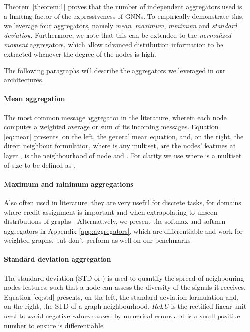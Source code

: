\documentclass{article}
\begin{document}
Theorem \ref{theorem:1} proves that the number of independent aggregators used is a limiting factor of the expressiveness of GNNs. To empirically demonstrate this, we leverage four aggregators, namely \textit{mean}, \textit{maximum}, \textit{minimum} and \textit{standard deviation}. Furthermore, we note that this can be extended to the \textit{normalized moment} aggregators, which allow advanced distribution information to be extracted whenever the degree of the nodes is high. 

The following paragraphs will describe the aggregators we leveraged in our architectures.

\paragraph{Mean aggregation }
The most common message aggregator in the literature, wherein each node computes a weighted average or sum of its incoming messages. Equation \ref{eq:mean} presents, on the left, the general mean equation, and, on the right, the direct neighbour formulation, where  is any multiset,  are the nodes' features at layer ,  is the neighbourhood of node  and . For clarity we use  where  is a multiset of size  to be defined as .



\paragraph{Maximum and minimum aggregations }
Also often used in literature, they are very useful for discrete tasks, for domains where credit assignment is important and when extrapolating to unseen distributions of graphs \cite{velickovic2019neural}. Alternatively, we present the softmax and softmin aggregators in Appendix \ref{app:aggregators}, which are differentiable and work for weighted graphs, but don't perform as well on our benchmarks.


\paragraph{Standard deviation aggregation }
The standard deviation (STD or ) is used to quantify the spread of neighbouring nodes features, such that a node can assess the diversity of the signals it receives. Equation \ref{eq:std} presents, on the left, the standard deviation formulation and, on the right, the STD of a graph-neighbourhood. \textit{ReLU} is the rectified linear unit used to avoid negative values caused by numerical errors and  is a small positive number to ensure  is differentiable.
\end{document}
